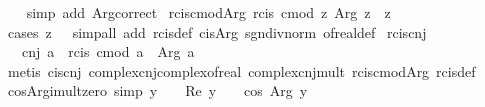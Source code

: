 \begin{isabellebody}
%
\isadelimproof
\ \ %
\endisadelimproof
%
\isatagproof
{}\isamarkupfalse%
\ {\isacharparenleft}{\kern0pt}simp\ add{\isacharcolon}{\kern0pt}\ Arg{\isacharunderscore}{\kern0pt}correct{\isacharparenright}{\kern0pt}%
\endisatagproof
{\isafoldproof}%
%
\isadelimproof
\isanewline
%
\endisadelimproof
\isanewline
{}\isamarkupfalse%
\ rcis{\isacharunderscore}{\kern0pt}cmod{\isacharunderscore}{\kern0pt}Arg{\isacharcolon}{\kern0pt}\ {\isachardoublequoteopen}rcis\ {\isacharparenleft}{\kern0pt}cmod\ z{\isacharparenright}{\kern0pt}\ {\isacharparenleft}{\kern0pt}Arg\ z{\isacharparenright}{\kern0pt}\ {\isacharequal}{\kern0pt}\ z{\isachardoublequoteclose}\isanewline
%
\isadelimproof
\ \ %
\endisadelimproof
%
\isatagproof
{}\isamarkupfalse%
\ {\isacharparenleft}{\kern0pt}cases\ {\isachardoublequoteopen}z\ {\isacharequal}{\kern0pt}\ {}{\isachardoublequoteclose}{\isacharparenright}{\kern0pt}\ {\isacharparenleft}{\kern0pt}simp{\isacharunderscore}{\kern0pt}all\ add{\isacharcolon}{\kern0pt}\ rcis{\isacharunderscore}{\kern0pt}def\ cis{\isacharunderscore}{\kern0pt}Arg\ sgn{\isacharunderscore}{\kern0pt}div{\isacharunderscore}{\kern0pt}norm\ of{\isacharunderscore}{\kern0pt}real{\isacharunderscore}{\kern0pt}def{\isacharparenright}{\kern0pt}%
\endisatagproof
{\isafoldproof}%
%
\isadelimproof
\isanewline
%
\endisadelimproof
\isanewline
{}\isamarkupfalse%
\ rcis{\isacharunderscore}{\kern0pt}cnj{\isacharcolon}{\kern0pt}\isanewline
\ \ \ {\isachardoublequoteopen}cnj\ a\ {\isacharequal}{\kern0pt}\ rcis\ {\isacharparenleft}{\kern0pt}cmod\ a{\isacharparenright}{\kern0pt}\ {\isacharparenleft}{\kern0pt}{\isacharminus}{\kern0pt}\ Arg\ a{\isacharparenright}{\kern0pt}{\isachardoublequoteclose}\isanewline
%
\isadelimproof
\ \ %
\endisadelimproof
%
\isatagproof
{}\isamarkupfalse%
\ {\isacharparenleft}{\kern0pt}metis\ cis{\isacharunderscore}{\kern0pt}cnj\ complex{\isacharunderscore}{\kern0pt}cnj{\isacharunderscore}{\kern0pt}complex{\isacharunderscore}{\kern0pt}of{\isacharunderscore}{\kern0pt}real\ complex{\isacharunderscore}{\kern0pt}cnj{\isacharunderscore}{\kern0pt}mult\ rcis{\isacharunderscore}{\kern0pt}cmod{\isacharunderscore}{\kern0pt}Arg\ rcis{\isacharunderscore}{\kern0pt}def{\isacharparenright}{\kern0pt}%
\endisatagproof
{\isafoldproof}%
%
\isadelimproof
\isanewline
%
\endisadelimproof
\isanewline
{}\isamarkupfalse%
\ cos{\isacharunderscore}{\kern0pt}Arg{\isacharunderscore}{\kern0pt}i{\isacharunderscore}{\kern0pt}mult{\isacharunderscore}{\kern0pt}zero\ {\isacharbrackleft}{\kern0pt}simp{\isacharbrackright}{\kern0pt}{\isacharcolon}{\kern0pt}\ {\isachardoublequoteopen}y\ {\isasymnoteq}\ {}\ {\isasymLongrightarrow}\ Re\ y\ {\isacharequal}{\kern0pt}\ {}\ {\isasymLongrightarrow}\ cos\ {\isacharparenleft}{\kern0pt}Arg\ y{\isacharparenright}{\kern0pt}\ {\isacharequal}{\kern0pt}\ {}{\isachardoublequoteclose}\isanewline

\end{isabellebody}
